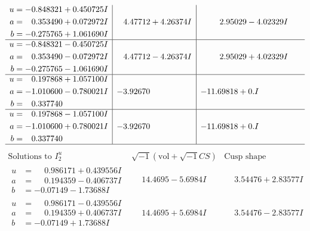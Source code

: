 \documentclass[1p]{elsarticle_modified}
\theoremstyle{definition}
\newcommand{\I}{\sqrt{-1}}
\begin{document}
$$\begin{array}{c|c|c}
\begin{aligned}
u &= -0.848321 + 0.450725 I \\
a &= \phantom{-}0.353490 + 0.072972 I \\
b &= -0.275765 + 1.061690 I\end{aligned}
 & \phantom{-}4.47712 + 4.26374 I & \phantom{-}2.95029 - 4.02329 I \\ \hline\begin{aligned}
u &= -0.848321 - 0.450725 I \\
a &= \phantom{-}0.353490 - 0.072972 I \\
b &= -0.275765 - 1.061690 I\end{aligned}
 & \phantom{-}4.47712 - 4.26374 I & \phantom{-}2.95029 + 4.02329 I \\ \hline\begin{aligned}
u &= \phantom{-}0.197868 + 1.057100 I \\
a &= -1.010600 - 0.780021 I \\
b &= \phantom{-}0.337740\phantom{ +0.000000I}\end{aligned}
 & -3.92670\phantom{ +0.000000I} & -11.69818 + 0. I\phantom{ +0.000000I} \\ \hline\begin{aligned}
u &= \phantom{-}0.197868 - 1.057100 I \\
a &= -1.010600 + 0.780021 I \\
b &= \phantom{-}0.337740\phantom{ +0.000000I}\end{aligned}
 & -3.92670\phantom{ +0.000000I} & -11.69818 + 0. I\phantom{ +0.000000I}\\
 \hline 
 \end{array}$$\newpage$$\begin{array}{c|c|c}  
\text{Solutions to }I^u_{2}& \I (\text{vol} + \sqrt{-1}CS) & \text{Cusp shape}\\
 \hline 
\begin{aligned}
u &= \phantom{-}0.986171 + 0.439556 I \\
a &= \phantom{-}0.194359 - 0.406737 I \\
b &= -0.07149 - 1.73688 I\end{aligned}
 & \phantom{-}14.4695 - 5.6984 I & \phantom{-}3.54476 + 2.83577 I \\ \hline\begin{aligned}
u &= \phantom{-}0.986171 - 0.439556 I \\
a &= \phantom{-}0.194359 + 0.406737 I \\
b &= -0.07149 + 1.73688 I\end{aligned}
 & \phantom{-}14.4695 + 5.6984 I & \phantom{-}3.54476 - 2.83577 I \\ \hline\begin{aligned}

\end{aligned}
\end{array}$$
\end{document}
